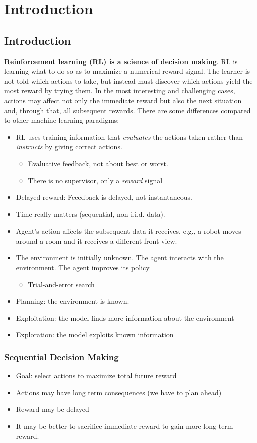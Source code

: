 \chapter{Introduction}
\section{Introduction}

\textbf{Reinforcement learning (RL) is a science of decision making}. RL is learning what to do so as to maximize a numerical reward signal. The learner is not told which actions to take, but instead must discover which actions yield the most reward by trying them. In the most interesting and challenging cases, actions may affect not only the immediate reward but also the next situation and, through that, all subsequent rewards. There are some differences compared to other machine learning paradigms:
\begin{itemize}
	\item RL uses training information that \textit{evaluates} the actions taken rather than \textit{instructs} by giving correct actions.
		\begin{itemize}
			\item Evaluative feedback, not about best or worst.
			\item There is no supervisor, only a \textit{reward} signal
		\end{itemize}
	\item Delayed reward: Feeedback is delayed, not instantaneous. 
	\item Time really matters (sequential, non i.i.d. data). 
	\item Agent's action affects the subsequent data it receives. e.g., a robot moves around a room and it receives a different front view.  
	\item The environment is initially unknown. The agent interacts with the environment. The agent improves its policy
		\begin{itemize}
			\item Trial-and-error search
		\end{itemize}
	\item Planning: the environment is known. 
	\item Exploitation: the model finds more information about the environment
	\item Exploration: the model exploits known information
\end{itemize}

\subsection{Sequential Decision Making}
\begin{itemize}
	\item Goal: select actions to maximize total future reward
	\item Actions may have long term consequences (we have to plan ahead)
	\item Reward may be delayed
	\item It may be better to sacrifice immediate reward to gain more long-term reward. 
\end{itemize}

